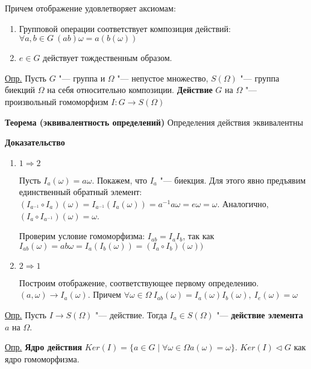 \documentclass{article}
\begin{document}
Причем отображение удовлетворяет аксиомам:
\begin{enumerate}
	\item Групповой операции соответствует композиция действий: $\forall a,b \in G \  (ab)\omega = a(b(\omega))$
	\item $e \in G$ действует тождественным образом.
\end{enumerate}

\underline{Опр.} Пусть $G$ "--- группа и $\Omega$ "--- непустое множество, $S(\Omega)$ "--- группа биекций $\Omega$ на себя относительно композиции. \textbf{Действие} $G$ на $\Omega$ "--- произвольный гомоморфизм $I: G \rightarrow S(\Omega)$

\vspace{10pt}

\textbf{Теорема (эквивалентность определений)}
Определения действия эквивалентны

\textbf{Доказательство}
\begin{enumerate}
	\item $1 \Rightarrow 2$
	
	Пусть $I_a(\omega) = a\omega$. Покажем, что $I_a$ "--- биекция. Для этого явно предъявим единственный обратный элемент: $(I_{a^{-1}} \circ I_a)(\omega) = I_{a^{-1}}(I_a(\omega)) = a^{-1}a\omega = e\omega = \omega$. Аналогично, $(I_a \circ I_{a^{-1}})(\omega) = \omega$.
	
	Проверим условие гомоморфизма: $I_{ab} = I_aI_b$, так как $I_{ab}(\omega) = ab\omega = I_a(I_b(\omega)) = (I_a \circ I_b)(\omega))$
	
	\item $2 \Rightarrow 1$
	
	Построим отображение, соответствующее первому определению. $(a, \omega) \rightarrow I_a(\omega)$. Причем $\forall \omega \in \Omega \  I_{ab}(\omega) = I_a(\omega)I_b(\omega), \  I_e(\omega) = \omega$ 
\end{enumerate}

\vspace{10pt}

\underline{Опр.} Пусть $I \rightarrow S(\Omega)$ "--- действие. Тогда $I_a \in S(\Omega)$ "--- \textbf{действие элемента} $a$ на $\Omega$.

\vspace{5pt}

\underline{Опр.} \textbf{Ядро действия} $Ker(I) = \{a \in G \mid \forall \omega \in \Omega a(\omega) = \omega \}$. $Ker(I) \triangleleft G$ как ядро гомоморфизма.

\vspace{5pt}
\end{document}

